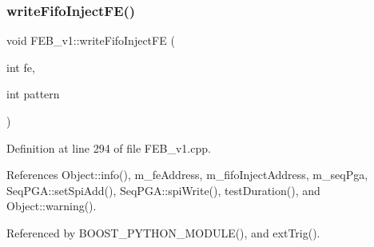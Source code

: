 \subsubsection{\texorpdfstring{write\+Fifo\+Inject\+F\+E()}{writeFifoInjectFE()}}
{\footnotesize\ttfamily void F\+E\+B\+\_\+v1\+::write\+Fifo\+Inject\+FE (\begin{DoxyParamCaption}\item[{int}]{fe,  }\item[{int}]{pattern }\end{DoxyParamCaption})}



Definition at line 294 of file F\+E\+B\+\_\+v1.\+cpp.



References Object\+::info(), m\+\_\+fe\+Address, m\+\_\+fifo\+Inject\+Address, m\+\_\+seq\+Pga, Seq\+P\+G\+A\+::set\+Spi\+Add(), Seq\+P\+G\+A\+::spi\+Write(), test\+Duration(), and Object\+::warning().



Referenced by B\+O\+O\+S\+T\+\_\+\+P\+Y\+T\+H\+O\+N\+\_\+\+M\+O\+D\+U\+L\+E(), and ext\+Trig().


